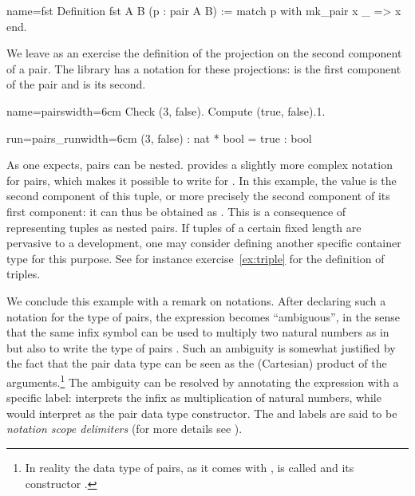 \begin{coq}{name=fst}{}
Definition fst A B (p : pair A B) :=
  match p with mk_pair x _ => x end.
\end{coq}

We leave as an exercise the definition of the projection on the second
component of a pair. The \mcbMC{} library has a notation for these
projections:  is the first component of the pair 
and  is its second.

\begin{coq-left}{name=pairs}{width=6cm}
Check (3, false).
Compute (true, false).1.
\end{coq-left}
\begin{coqout-right}{run=pairs_run}{width=6cm}
(3, false) : nat * bool
 = true : bool
\end{coqout-right}

As one expects, pairs can be nested. \Coq{} provides a slightly more complex
notation for pairs, which makes it possible to write  for
. In this example, the value  is the second
component of this tuple, or more precisely the second component of its
first component: it can thus be obtained as . This is a
consequence of representing tuples as nested pairs. If
tuples of a certain fixed length are pervasive to a development, one
may consider defining another specific container type for this
purpose. See for instance exercise~\ref{ex:triple} for the definition
of triples.

We conclude this example with a remark on notations. After declaring
such a notation for the type of pairs, the expression 
becomes ``ambiguous'',
in the sense that the same infix \C{*} symbol can be used to multiply two
natural numbers as in  but also to write the type of pairs .  Such an ambiguity is somewhat justified by the fact that the pair
data type can be seen as the (Cartesian) product of the arguments.\footnote{In reality the data type of pairs, as it comes with \Coq{}, is called  and its constructor .}  The
ambiguity can be resolved by annotating the expression with a specific
label:  interprets the infix \C{*} as multiplication of natural numbers,
while  would interpret \C{*} as the pair data type
constructor. The  and  labels are said to be
\emph{notation scope delimiters} (for more details see
\cite[section 6.1.2, ``Interpretation scopes'']{Coq:manual}).

